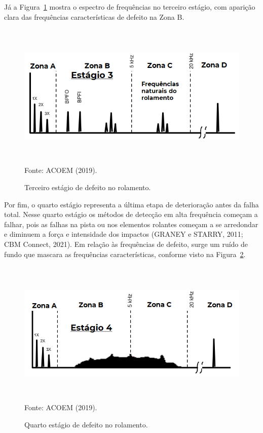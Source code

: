 \documentclass[
	12pt,				
	oneside,			
	a4paper,			
	english,			
	brazil,			
	]{abntex2ppgsi}
\begin{document}
Já a Figura~\ref{estagio_3} mostra o espectro de frequências no terceiro estágio, com aparição clara das frequências características de defeito na Zona B.

\begin{figure}[H]
\centering
\caption {Terceiro estágio de defeito no rolamento.}
\includegraphics[width=\textwidth,height=70mm,keepaspectratio]{estagio_3}  \\
Fonte: ACOEM (2019).
\label{estagio_3}
\end{figure}

Por fim, o quarto estágio representa a última etapa de deterioração antes da falha total. Nesse quarto estágio os métodos de detecção em alta frequência começam a falhar, pois as falhas na pista ou nos elementos rolantes começam a se arredondar e diminuem a força e intensidade dos impactos (GRANEY e STARRY, 2011; CBM Connect, 2021). Em relação às frequências de defeito, surge um ruído de fundo que mascara as frequências características, conforme visto na Figura~\ref{estagio_4}.

\begin{figure}[H]
\centering
\caption {Quarto estágio de defeito no rolamento.}
\includegraphics[width=\textwidth,height=70mm,keepaspectratio]{estagio_4} \\
Fonte: ACOEM (2019).
\label{estagio_4}
\end{figure}
\end{document}
